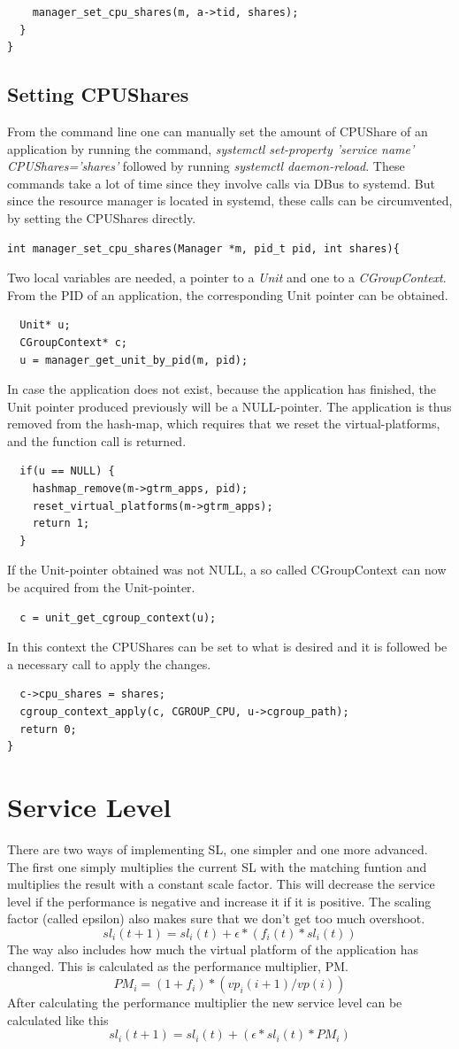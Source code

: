 \documentclass[nobiblatex]{LTHthesis}
\begin{document}
\begin{verbatim}
    manager_set_cpu_shares(m, a->tid, shares);
  }
}
\end{verbatim}
\subsection{Setting CPUShares}
From the command line one can manually set the amount of CPUShare of an application by running the command, \emph{systemctl set-property 'service name' CPUShares='shares'} followed by running \emph{systemctl daemon-reload}. These commands take a lot of time since they involve calls via DBus to systemd. But since the resource manager is located in systemd, these calls can be circumvented, by setting the CPUShares directly.
\begin{verbatim}
int manager_set_cpu_shares(Manager *m, pid_t pid, int shares){
\end{verbatim}
Two local variables are needed, a pointer to a \emph{Unit} and one to a \emph{CGroupContext}. From the PID of an application, the corresponding Unit pointer can be obtained.
\begin{verbatim}
  Unit* u;
  CGroupContext* c;
  u = manager_get_unit_by_pid(m, pid);
\end{verbatim}
In case the application does not exist, because the application has finished, the Unit pointer produced previously will be a NULL-pointer. The application is thus removed from the hash-map, which requires that we reset the virtual-platforms, and the function call is returned.
\begin{verbatim}
  if(u == NULL) {
    hashmap_remove(m->gtrm_apps, pid);
    reset_virtual_platforms(m->gtrm_apps);
    return 1;
  }
\end{verbatim}
If the Unit-pointer obtained was not NULL, a so called CGroupContext can now be acquired from the Unit-pointer.
\begin{verbatim}
  c = unit_get_cgroup_context(u);
\end{verbatim}
In this context the CPUShares can be set to what is desired and it is followed be a necessary call to apply the changes.
\begin{verbatim}
  c->cpu_shares = shares;
  cgroup_context_apply(c, CGROUP_CPU, u->cgroup_path);
  return 0;
}
\end{verbatim}


\section{Service Level}
There are two ways of implementing SL, one simpler and one more advanced. The first one simply multiplies the current SL with the matching funtion and multiplies the result with a constant scale factor. This will decrease the service level if the performance is negative and increase it if it is positive. The scaling factor (called epsilon) also makes sure that we don't get too much overshoot. 
\[sl_i(t+1)= sl_i(t) + \epsilon*(f_i(t)*sl_i(t)) \]
The way also includes how much the virtual platform of the application has changed. This is calculated as the performance multiplier, PM.
\[PM_i = (1+f_i)*(vp_i(i+1)/vp(i))\]
After calculating the performance multiplier the new service level can be calculated like this
\[sl_i(t+1)=sl_i(t) + (\epsilon*sl_i(t)*PM_i)\]
\end{document}
